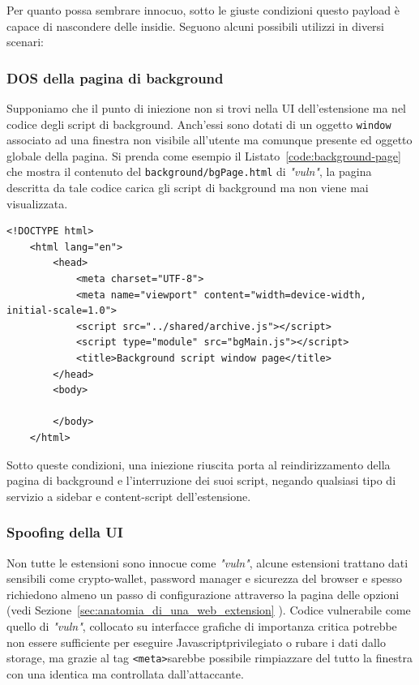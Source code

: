 \documentclass{sapthesis}
\newcommand{\code}[1]{\texttt{#1}}
\newcommand{\file}[1]{\code{#1}}
\newcommand{\refSection}[1]{Sezione~\ref{#1}}
\newcommand{\refCode}[1]{Listato~\ref{#1}}
\newcommand{\Listato}[1]{\refCode{#1}}
\newcommand{\vuln}{\textit{"vuln"}}
\newcommand{\JS}{Javascript}
\newcommand{\tagHTML}[1]{\code{<#1>}}
\newcommand{\meta}{\tagHTML{meta}}
\begin{document}
            Per quanto possa sembrare innocuo, sotto le giuste condizioni questo payload è capace di
            nascondere delle insidie. Seguono alcuni possibili utilizzi in diversi scenari:
            
            \subsubsection{DOS della pagina di background}
                Supponiamo che il punto di iniezione non si trovi nella UI dell'estensione ma nel
                codice degli script di background. Anch'essi sono dotati di un oggetto \code{window}
                associato ad una finestra non visibile all'utente ma comunque presente ed oggetto 
                globale della pagina. Si prenda come esempio il \Listato{code:background-page} che
                mostra il contenuto del \file{background/bgPage.html} di \vuln{}, la pagina descritta
                da tale codice carica gli script di background ma non viene mai visualizzata.

                \begin{lstlisting}[label=code:background-page]
    <!DOCTYPE html>
    <html lang="en">
        <head>
            <meta charset="UTF-8">
            <meta name="viewport" content="width=device-width, initial-scale=1.0">
            <script src="../shared/archive.js"></script>
            <script type="module" src="bgMain.js"></script>
            <title>Background script window page</title>
        </head>
        <body>
            
        </body>
    </html>
                \end{lstlisting}

                Sotto queste condizioni, una iniezione riuscita porta al reindirizzamento della pagina
                di background e l'interruzione dei suoi script, negando qualsiasi tipo di servizio a
                sidebar e content-script dell'estensione. 

            \subsubsection{Spoofing della UI}
                Non tutte le estensioni sono innocue come \vuln{}, alcune estensioni trattano dati
                sensibili come crypto-wallet, password manager e sicurezza del browser e spesso
                richiedono almeno un passo di configurazione attraverso la pagina delle opzioni 
                (vedi \refSection{sec:anatomia_di_una_web_extension} ). Codice vulnerabile come 
                quello di \vuln{}, collocato su interfacce grafiche di importanza critica potrebbe
                non essere sufficiente per eseguire \JS privilegiato o rubare i dati dallo storage,
                ma grazie al tag \meta sarebbe possibile rimpiazzare del tutto la finestra con
                una identica ma controllata dall'attaccante.
\end{document}
